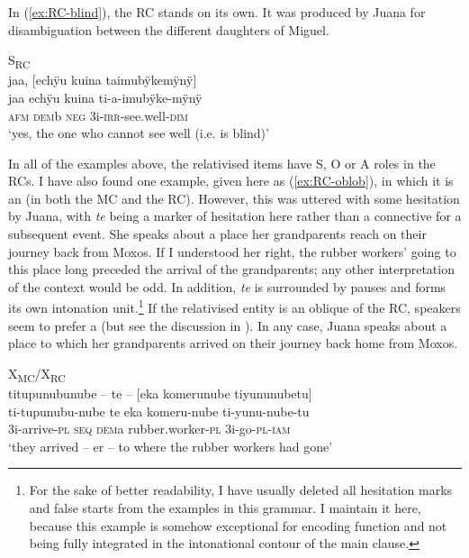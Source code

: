 In (\ref{ex:RC-blind}), the RC stands on its own. It was produced by Juana for disambiguation between the different daughters of Miguel.

\ea\label{ex:RC-blind}
\begingl
\glpreamble \textup{S\textsubscript{RC}}\\jaa, \textup{[}echÿu kuina taimubÿkemÿnÿ\textup{]}\\
\gla jaa echÿu kuina ti-a-imubÿke-mÿnÿ\\
\glb \textsc{afm} \textsc{dem}b \textsc{neg} 3i-\textsc{irr}-see.well-\textsc{dim}\\
\glft ‘yes, the one who cannot see well (i.e. is blind)’
\endgl
\trailingcitation{[jxx-p120430l-1.087]}
\xe{}

In all of the examples above, the relativised items have S, O or A roles in the RCs. I have also found one example, given here as (\ref{ex:RC-oblob}), in which it is an  (in both the MC and the RC). However, this was uttered with some hesitation by Juana, with \textit{te} being a marker of hesitation here rather than a connective for a subsequent event. She speaks about a place her grandparents reach on their journey back from Moxos. If I understood her right, the rubber workers’ going to this place long preceded the arrival of the grandparents; any other interpretation of the context would be odd. In addition, \textit{te} is surrounded by pauses and forms its own intonation unit.\footnote{For the sake of better readability, I have usually deleted all hesitation marks and false starts from the examples in this grammar. I maintain it here, because this example is somehow exceptional for encoding  function and not being fully integrated in the intonational contour of the main clause.} If the relativised entity is an oblique of the RC, speakers seem to prefer a  (but see the discussion in ). In any case, Juana speaks about a place to which her grandparents arrived on their journey back home from Moxos.

\ea\label{ex:RC-oblob}
\begingl
\glpreamble \textup{X\textsubscript{MC}/X\textsubscript{RC}}\\titupunubunube – te – \textup{[}eka komerunube tiyununubetu\textup{]}\\
\gla ti-tupunubu-nube te eka komeru-nube ti-yunu-nube-tu\\
\glb3i-arrive-\textsc{pl} \textsc{seq} \textsc{dem}a rubber.worker-\textsc{pl} 3i-go-\textsc{pl}-\textsc{iam} \\
\glft ‘they arrived – er – to where the rubber workers had gone’
\endgl
\trailingcitation{[jxx-p151016l-2.255-256]}
\xe

